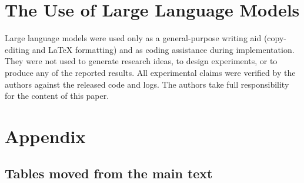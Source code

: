 \documentclass{article}
\begin{document}
\section*{The Use of Large Language Models}
Large language models were used only as a general-purpose writing aid (copy-editing and
LaTeX formatting) and as coding assistance during implementation. They were not used to
generate research ideas, to design experiments, or to produce any of the reported
results. All experimental claims were verified by the authors against the released code
and logs. The authors take full responsibility for the content of this paper.




\appendix
\section{Appendix}

\subsection{Tables moved from the main text}
\label{app:movedtables}
\end{document}
